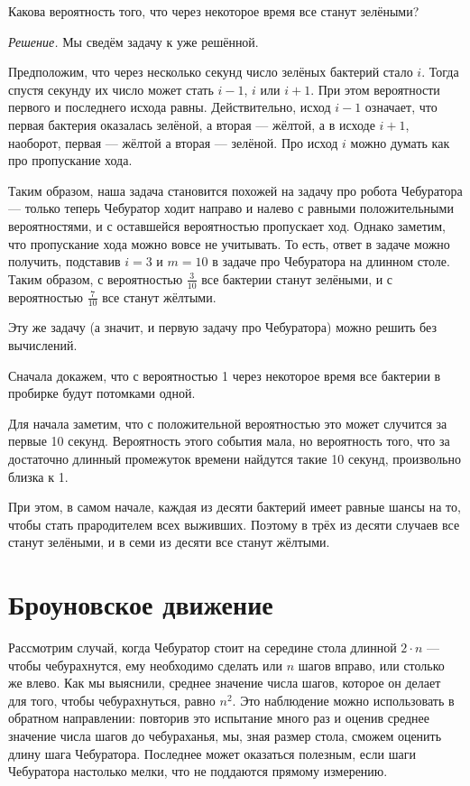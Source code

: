\documentclass{article}
\begin{document}
Какова вероятность того, что через некоторое время все станут зелёными?

\medskip
\noindent\textit{Решение.}
Мы сведём задачу к уже решённой.

Предположим, что через несколько секунд 
число зелёных бактерий стало $i$.
Тогда спустя секунду их число может стать $i-1$, $i$ или $i+1$.
При этом вероятности первого и последнего исхода равны.
Действительно, исход $i-1$ означает, 
что первая бактерия оказалась зелёной, а вторая --- жёлтой,
а в исходе $i+1$,
наоборот, первая --- жёлтой а вторая --- зелёной.
Про исход $i$ можно думать как про пропускание хода.

Таким образом, наша задача становится похожей на задачу про робота Чебуратора --- только теперь Чебуратор ходит направо и налево с равными положительными вероятностями, и с оставшейся вероятностью пропускает ход.
Однако заметим, что пропускание хода можно вовсе не учитывать.
То есть, ответ в задаче можно получить, подставив $i=3$ и $m=10$ в задаче про Чебуратора на длинном столе.
Таким образом, с вероятностью $\tfrac{3}{10}$ все бактерии станут зелёными, 
и с вероятностью $\tfrac{7}{10}$ все станут жёлтыми.

\medskip

Эту же задачу (а значит, и первую задачу про Чебуратора)
можно решить без вычислений.

Сначала докажем, что с вероятностью 1
через некоторое время все бактерии в пробирке будут потомками одной.

Для начала заметим, что с положительной вероятностью это может случится за первые 10 секунд. 
Вероятность этого события мала,
но вероятность того, что за достаточно длинный промежуток времени найдутся такие 10 секунд, произвольно близка к 1.

При этом, в самом начале, каждая из десяти бактерий 
имеет равные шансы на то, чтобы стать прародителем всех выживших.
Поэтому в трёх из десяти случаев все станут зелёными, 
и в семи из десяти все станут жёлтыми.


\section{Броуновское движение}

Рассмотрим случай, когда Чебуратор стоит на середине стола длинной $2\cdot n$ ---
чтобы чебурахнутся, ему необходимо сделать или $n$ шагов вправо, или столько же влево.
Как мы выяснили, среднее значение числа шагов, которое он делает для того, чтобы чебурахнуться, равно $n^2$. 
Это наблюдение можно использовать в обратном направлении:
повторив это испытание много раз и оценив среднее значение числа шагов до чебураханья, мы, 
зная размер стола, сможем оценить длину шага Чебуратора.
Последнее может оказаться полезным, если шаги Чебуратора настолько мелки, что не поддаются прямому измерению. 
\end{document}
